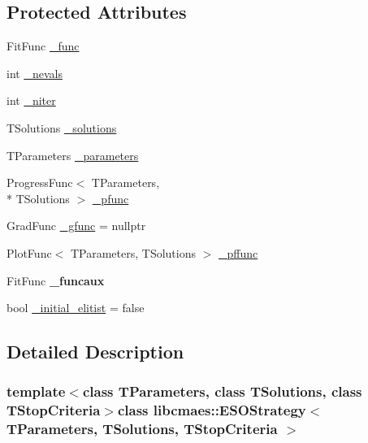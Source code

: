 \subsection*{Protected Attributes}
\begin{DoxyCompactItemize}
\item 
Fit\-Func \hyperlink{classlibcmaes_1_1ESOStrategy_a1a29d4c30bbdb6021920275e81fa4dc4}{\-\_\-func}
\item 
int \hyperlink{classlibcmaes_1_1ESOStrategy_a19667f1e69856e7cfd6219b63cbaa59d}{\-\_\-nevals}
\item 
int \hyperlink{classlibcmaes_1_1ESOStrategy_aaf5c063558da34826ea1f976423ccfbb}{\-\_\-niter}
\item 
T\-Solutions \hyperlink{classlibcmaes_1_1ESOStrategy_a8fe0f8dc2201951e9e4ed2768b5a09ab}{\-\_\-solutions}
\item 
T\-Parameters \hyperlink{classlibcmaes_1_1ESOStrategy_a295e49238ceef8f11b3fb35296a8364a}{\-\_\-parameters}
\item 
Progress\-Func$<$ T\-Parameters, \\*
T\-Solutions $>$ \hyperlink{classlibcmaes_1_1ESOStrategy_a25d597189596f434a2530887fddea189}{\-\_\-pfunc}
\item 
Grad\-Func \hyperlink{classlibcmaes_1_1ESOStrategy_a76926e49a2ca941a22362167bc230093}{\-\_\-gfunc} = nullptr
\item 
Plot\-Func$<$ T\-Parameters, T\-Solutions $>$ \hyperlink{classlibcmaes_1_1ESOStrategy_af2c9909de76f98e4b9c207bda577255d}{\-\_\-pffunc}
\item 
\hypertarget{classlibcmaes_1_1ESOStrategy_a3b59faa95ebae7336607b9b4ebd0c266}{Fit\-Func {\bfseries \-\_\-funcaux}}\label{classlibcmaes_1_1ESOStrategy_a3b59faa95ebae7336607b9b4ebd0c266}

\item 
bool \hyperlink{classlibcmaes_1_1ESOStrategy_a1ee27b35458c52501bebf5bdc42de385}{\-\_\-initial\-\_\-elitist} = false
\end{DoxyCompactItemize}


\subsection{Detailed Description}
\subsubsection*{template$<$class T\-Parameters, class T\-Solutions, class T\-Stop\-Criteria$>$class libcmaes\-::\-E\-S\-O\-Strategy$<$ T\-Parameters, T\-Solutions, T\-Stop\-Criteria $>$}

